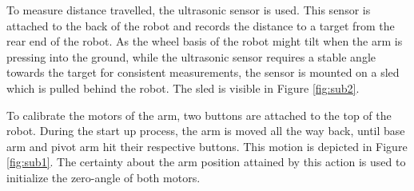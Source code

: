 \documentclass[11pt, a4paper]{article}
\begin{document}
	To measure distance travelled, the ultrasonic sensor is used. This sensor is attached to the back of the robot and records the distance to a target from the rear end of the robot. As the wheel basis of the robot might tilt when the arm is pressing into the ground, while the ultrasonic sensor requires a stable angle towards the target for consistent measurements, the sensor is mounted on a sled which is pulled behind the robot. The sled is visible in Figure \ref{fig:sub2}.
	
	To calibrate the motors of the arm, two buttons are attached to the top of the robot. During the start up process, the arm is moved all the way back, until base arm and pivot arm hit their respective buttons. This motion is depicted in Figure \ref{fig:sub1}. The certainty about the arm position attained by this action is used to initialize the zero-angle of both motors.
	
\end{document}
